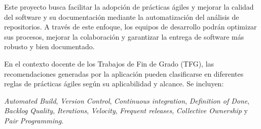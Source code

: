 Este proyecto busca facilitar la adopción de prácticas ágiles y mejorar la calidad del software y su documentación mediante la automatización del análisis de repositorios. A través de este enfoque, los equipos de desarrollo podrán optimizar sus procesos, mejorar la colaboración y garantizar la entrega de software más robusto y bien documentado.

En el contexto docente de los Trabajos de Fin de Grado (TFG), las recomendaciones generadas por la aplicación pueden clasificarse en diferentes reglas de prácticas ágiles según su aplicabilidad y alcance. Se incluyen:

\textit{Automated Build}, \textit{Version Control}, \textit{Continuous integration}, \textit{Definition of Done}, \textit{Backlog Quality}, \textit{Iterations}, \textit{Velocity}, \textit{Frequent releases}, \textit{Collective Ownership} y \textit{Pair Programming}.